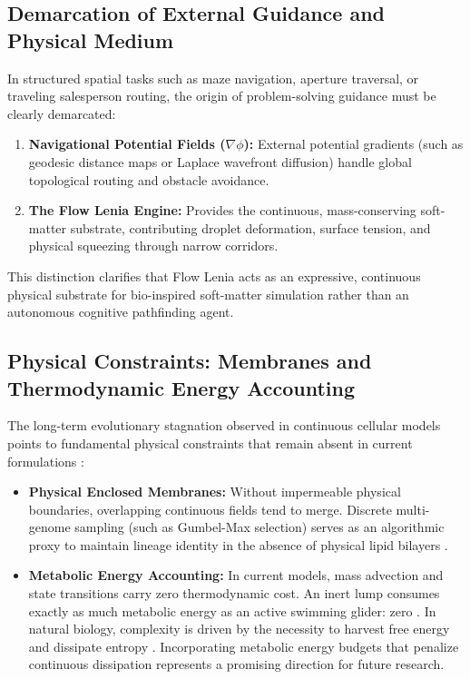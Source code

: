 \subsection{Demarcation of External Guidance and Physical Medium}
\label{subsec:disc_agency_demarcation}

In structured spatial tasks such as maze navigation, aperture traversal, or traveling salesperson routing, the origin of problem-solving guidance must be clearly demarcated:
\begin{enumerate}
    \item \textbf{Navigational Potential Fields ($\nabla \phi$):} External potential gradients (such as geodesic distance maps or Laplace wavefront diffusion) handle global topological routing and obstacle avoidance.
    \item \textbf{The Flow Lenia Engine:} Provides the continuous, mass-conserving soft-matter substrate, contributing droplet deformation, surface tension, and physical squeezing through narrow corridors.
\end{enumerate}
This distinction clarifies that Flow Lenia acts as an expressive, continuous physical substrate for bio-inspired soft-matter simulation rather than an autonomous cognitive pathfinding agent.

\subsection{Physical Constraints: Membranes and Thermodynamic Energy Accounting}
\label{subsec:disc_missing_physics}

The long-term evolutionary stagnation observed in continuous cellular models points to fundamental physical constraints that remain absent in current formulations \parencite{ruiz2004universal, schrodinger1944what}:
\begin{itemize}
    \item \textbf{Physical Enclosed Membranes:} Without impermeable physical boundaries, overlapping continuous fields tend to merge. Discrete multi-genome sampling (such as Gumbel-Max selection) serves as an algorithmic proxy to maintain lineage identity in the absence of physical lipid bilayers \parencite{plantec2025flowlenia}.
    \item \textbf{Metabolic Energy Accounting:} In current models, mass advection and state transitions carry zero thermodynamic cost. An inert lump consumes exactly as much metabolic energy as an active swimming glider: zero \parencite{schrodinger1944what}. In natural biology, complexity is driven by the necessity to harvest free energy and dissipate entropy \parencite{england2013statistical}. Incorporating metabolic energy budgets that penalize continuous dissipation represents a promising direction for future research.
\end{itemize}

